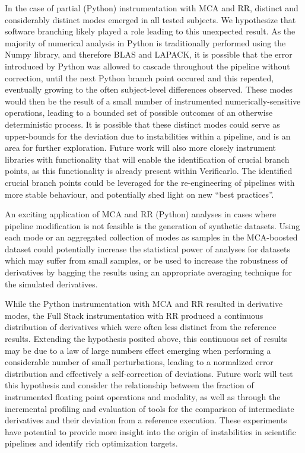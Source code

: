 \documentclass[fleqn,12pt]{SelfArx_ch} %
\begin{document}
In the case of partial (Python) instrumentation with MCA and RR, distinct and considerably distinct modes emerged in
all tested subjects. We hypothesize that software branching likely played a role leading to this unexpected result. As
the majority of numerical analysis in Python is traditionally performed using the Numpy library, and therefore BLAS and
LAPACK, it is possible that the error introduced by Python was allowed to cascade throughout the pipeline without
correction, until the next Python branch point occured and this repeated, eventually growing to the often subject-level
differences observed. These modes would then be the result of a small number of instrumented numerically-sensitive
operations, leading to a bounded set of possible outcomes of an otherwise deterministic process. It is possible that
these distinct modes could serve as upper-bounds for the deviation due to instabilities within a pipeline, and is an
area for further exploration. Future work will also more closely instrument libraries with functionality that will
enable the identification of crucial branch points, as this functionality is already present within Verificarlo. The
identified crucial branch points could be leveraged for the re-engineering of pipelines with more stable behaviour,
and potentially shed light on new ``best practices''.

An exciting application of MCA and RR (Python) analyses in cases where pipeline modification is not feasible is the
generation of synthetic datasets. Using each mode or an aggregated collection of modes as samples in the MCA-boosted
dataset could potentially increase the statistical power of analyses for datasets which may suffer from small samples,
or be used to increase the robustness of derivatives by bagging the results using an appropriate averaging technique
for the simulated derivatives.

While the Python instrumentation with MCA and RR resulted in derivative modes, the Full Stack instrumentation with RR
produced a continuous distribution of derivatives which were often less distinct from the reference results. Extending
the hypothesis posited above, this continuous set of results may be due to a law of large numbers effect emerging when
performing a considerable number of small perturbations, leading to a normalized error distribution and effectively a
self-correction of deviations. Future work will test this hypothesis and consider the relationship between the fraction
of instrumented floating point operations and modality, as well as through the incremental profiling and evaluation of
tools for the comparison of intermediate derivatives and their deviation from a reference execution. These experiments
have potential to provide more insight into the origin of instabilities in scientific pipelines and identify rich
optimization targets.
\end{document}
